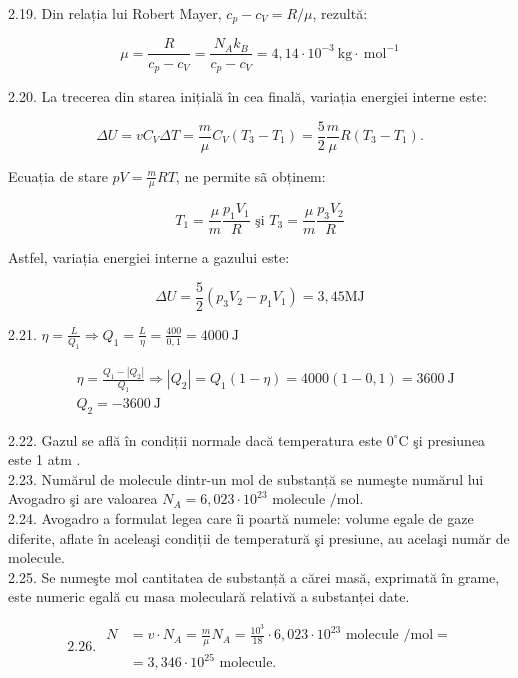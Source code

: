 \documentclass[10pt]{article}
\begin{document}
2.19. Din relația lui Robert Mayer, $c_{p}-c_{V}=R / \mu$, rezultă:

$$
\mu=\frac{R}{c_{p}-c_{V}}=\frac{N_{A} k_{B}}{c_{p}-c_{V}}=4,14 \cdot 10^{-3} \mathrm{~kg} \cdot \mathrm{~mol}^{-1}
$$

2.20. La trecerea din starea inițială în cea finală, variația energiei interne este:

$$
\Delta U=v C_{V} \Delta T=\frac{m}{\mu} C_{V}\left(T_{3}-T_{1}\right)=\frac{5}{2} \frac{m}{\mu} R\left(T_{3}-T_{1}\right) .
$$

Ecuația de stare $p V=\frac{m}{\mu} R T$, ne permite sã obținem:

$$
T_{1}=\frac{\mu}{m} \frac{p_{1} V_{1}}{R} \text { şi } T_{3}=\frac{\mu}{m} \frac{p_{3} V_{2}}{R}
$$

Astfel, variația energiei interne a gazului este:

$$
\Delta U=\frac{5}{2}\left(p_{3} V_{2}-p_{1} V_{1}\right)=3,45 \mathrm{MJ}
$$

2.21. $\eta=\frac{L}{Q_{1}} \Rightarrow Q_{1}=\frac{L}{\eta}=\frac{400}{0,1}=4000 \mathrm{~J}$

$$
\begin{aligned}
& \eta=\frac{Q_{1}-\left|Q_{2}\right|}{Q_{1}} \Rightarrow\left|Q_{2}\right|=Q_{1}(1-\eta)=4000(1-0,1)=3600 \mathrm{~J} \\
& Q_{2}=-3600 \mathrm{~J}
\end{aligned}
$$

2.22. Gazul se află în condiții normale dacă temperatura este $0^{\circ} \mathrm{C}$ şi presiunea este 1 atm .\\
2.23. Numărul de molecule dintr-un mol de substanță se numeşte numărul lui Avogadro şi are valoarea $N_{A}=6,023 \cdot 10^{23}$ molecule $/ \mathrm{mol}$.\\
2.24. Avogadro a formulat legea care îi poartă numele: volume egale de gaze diferite, aflate în aceleaşi condiții de temperatură şi presiune, au acelaşi număr de molecule.\\
2.25. Se numeşte mol cantitatea de substanță a cărei masă, exprimată în grame, este numeric egală cu masa moleculară relativă a substanței date.

$$
\text { 2.26. } \begin{aligned}
N & =v \cdot N_{A}=\frac{m}{\mu} N_{A}=\frac{10^{3}}{18} \cdot 6,023 \cdot 10^{23} \text { molecule } / \mathrm{mol}= \\
& =3,346 \cdot 10^{25} \text { molecule. }
\end{aligned}
$$
\end{document}
